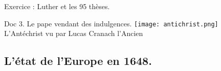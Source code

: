\documentclass{beamer}
\begin{document}
\begin{frame}{Exercice : Luther et les 95 thèses.}
\begin{beamerboxesrounded}[scheme=blocimage]{Doc 3. Le pape vendant des indulgences.}
\texttt{[image: antichrist.png]} \\
\tiny L'Antéchrist vu par Lucas Cranach l'Ancien
\end{beamerboxesrounded}
\end{frame}

\subsection{L'état de l'Europe en 1648.}



  
\end{document}
